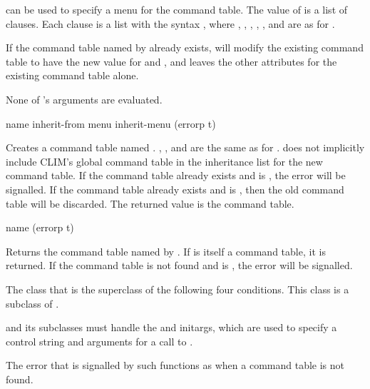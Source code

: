  can be used to specify a menu for the command table.  The value of
 is a list of clauses.  Each clause is a list with the syntax
, where , ,
, , , and  are as
for .

If the command table named by  already exists,
 will modify the existing command table to have the new
value for  and , and leaves the other attributes for
the existing command table alone.

None of 's arguments are evaluated.


 {name \key inherit-from menu inherit-menu (errorp t)}

Creates a command table named .  , , and
 are the same as for .
 does not implicitly include CLIM's global command table
in the inheritance list for the new command table.  If the command table already
exists and  is , the 
error will be signalled.  If the command table already exists and 
is , then the old command table will be discarded.  The returned
value is the command table.


 {name \key (errorp t)}

Returns the command table named by .  If  is itself a
command table, it is returned.  If the command table is not found and
 is , the  error will be
signalled.



The class that is the superclass of the following four conditions.  This class
is a subclass of .

 and its subclasses must handle the 
and  initargs, which are used to specify a control string
and arguments for a call to .


The error that is signalled by such functions as  when a
command table is not found.

